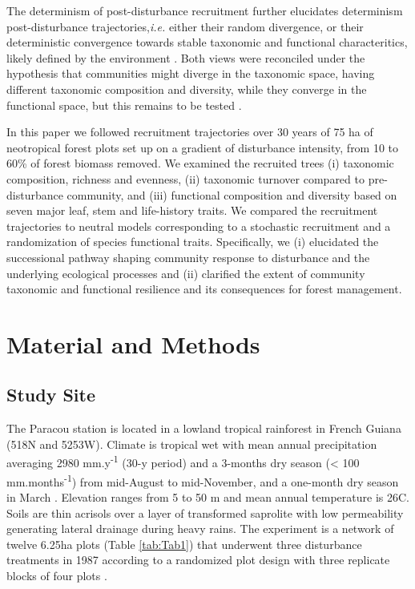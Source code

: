\documentclass[fleqn,10pt]{ArtEcoFoG} %
\begin{document}
The determinism of post-disturbance recruitment further elucidates
determinism post-disturbance trajectories,\emph{i.e.} either their
random divergence, or their deterministic convergence towards stable
taxonomic and functional characteritics, likely defined by the
environment \citep{Clements1916, Diamond1975}. Both views were
reconciled under the hypothesis that communities might diverge in the
taxonomic space, having different taxonomic composition and diversity,
while they converge in the functional space, but this remains to be
tested \citep{Fukami2005, Li2018}.

In this paper we followed recruitment trajectories over 30 years of 75
ha of neotropical forest plots set up on a gradient of disturbance
intensity, from 10 to 60\% of forest biomass removed. We examined the
recruited trees (i) taxonomic composition, richness and evenness, (ii)
taxonomic turnover compared to pre-disturbance community, and (iii)
functional composition and diversity based on seven major leaf, stem and
life-history traits. We compared the recruitment trajectories to neutral
models corresponding to a stochastic recruitment and a randomization of
species functional traits. Specifically, we (i) elucidated the
successional pathway shaping community response to disturbance and the
underlying ecological processes and (ii) clarified the extent of
community taxonomic and functional resilience and its consequences for
forest management.

\section{Material and Methods}\label{material-and-methods}

\subsection{Study Site}\label{study-site}

The Paracou station is located in a lowland tropical rainforest in
French Guiana (518\textdegree N and 5253\textdegree W). Climate is
tropical wet with mean annual precipitation averaging 2980
mm.y\textsuperscript{-1} (30-y period) and a 3-months dry season
(\textless{} 100 mm.months\textsuperscript{-1}) from mid-August to
mid-November, and a one-month dry season in March \citep{Wagner2011}.
Elevation ranges from 5 to 50 m and mean annual temperature is
26\textdegree C. Soils are thin acrisols over a layer of transformed
saprolite with low permeability generating lateral drainage during heavy
rains. The experiment is a network of twelve 6.25ha plots (Table
\ref{tab:Tab1}) that underwent three disturbance treatments in 1987
according to a randomized plot design with three replicate blocks of
four plots \citep{Herault2018}.
\end{document}
